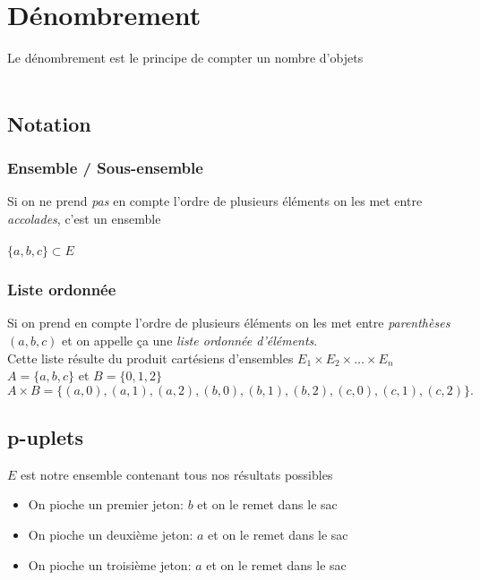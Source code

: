 \chapter{Dénombrement}
Le dénombrement est le principe de compter un nombre d'objets \\ \\

\section{Notation}
\subsection{Ensemble / Sous-ensemble}
Si on ne prend \emph{pas} en compte l'ordre de plusieurs éléments on les met entre \emph{accolades}, c'est un ensemble \\ \\
$\{a, b, c\} \subset E$

\subsection{Liste ordonnée}
Si on prend en compte l'ordre de plusieurs éléments on les met entre \emph{parenthèses} $(a, b, c)$ et on appelle ça une \emph{liste ordonnée d'éléments}. \\
Cette liste résulte du produit cartésiens d'ensembles $E_1 \times E_2 \times \dots \times E_n$
$A = \{a, b, c\}$ et $B = \{0, 1, 2\}$ \\
$A \times B = \{(a, 0), (a, 1), (a, 2), (b, 0), (b, 1), (b, 2), (c, 0), (c, 1), (c, 2)\}.$

\pagebreak

\section{p-uplets}
$E$ est notre ensemble contenant tous nos résultats possibles

\begin{itemize}
  \item On pioche un premier jeton: $b$ et on le remet dans le sac
  \item On pioche un deuxième jeton: $a$ et on le remet dans le sac
  \item On pioche un troisième jeton: $a$ et on le remet dans le sac \\
\end{itemize}

